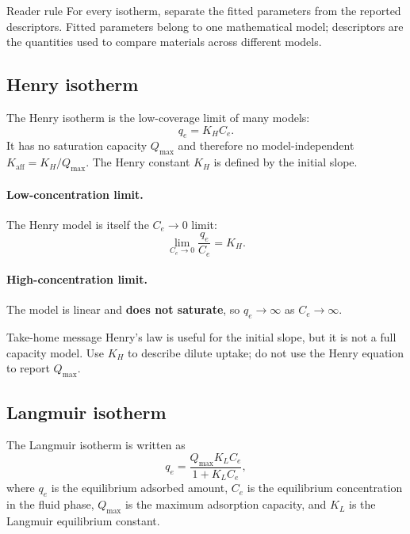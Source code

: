 \documentclass[journal=jacsat,manuscript=article]{achemso}
\begin{document}
\begin{bluebox}{Reader rule}
	For every isotherm, separate the fitted parameters from the reported
	descriptors. Fitted parameters belong to one mathematical model;
	descriptors are the quantities used to compare materials across
	different models.
\end{bluebox}

\subsection{Henry isotherm}
\label{sec:si_henry}

The Henry isotherm is the low-coverage limit of many models:
\begin{equation}
	q_e = K_H C_e.
	\label{eq:si_henry_model}
\end{equation}
It has no saturation capacity $Q_{\max}$ and therefore no
model-independent $K_{\mathrm{aff}} = K_H/Q_{\max}$. The Henry constant
$K_H$ is defined by the initial slope.

\paragraph{Low-concentration limit.}
The Henry model is itself the $C_e \to 0$ limit:
\begin{equation}
	\lim_{C_e \to 0} \frac{q_e}{C_e} = K_H.
\end{equation}

\paragraph{High-concentration limit.}
The model is linear and \textbf{does not saturate}, so $q_e \to \infty$ as
$C_e \to \infty$.

\begin{greenbox}{Take-home message}
	Henry's law is useful for the initial slope, but it is not a full
	capacity model. Use \(K_H\) to describe dilute uptake; do not use the
	Henry equation to report \(Q_{\max}\).
\end{greenbox}

\subsection{Langmuir isotherm}
\label{sec:si_langmuir}

The Langmuir isotherm is written as
\begin{equation}
	q_e = \frac{Q_{\max} K_L C_e}{1 + K_L C_e},
	\label{eq:si_langmuir}
\end{equation}
where \(q_e\) is the equilibrium adsorbed amount, \(C_e\) is the
equilibrium concentration in the fluid phase, \(Q_{\max}\) is the maximum
adsorption capacity, and \(K_L\) is the Langmuir equilibrium constant.
\end{document}
